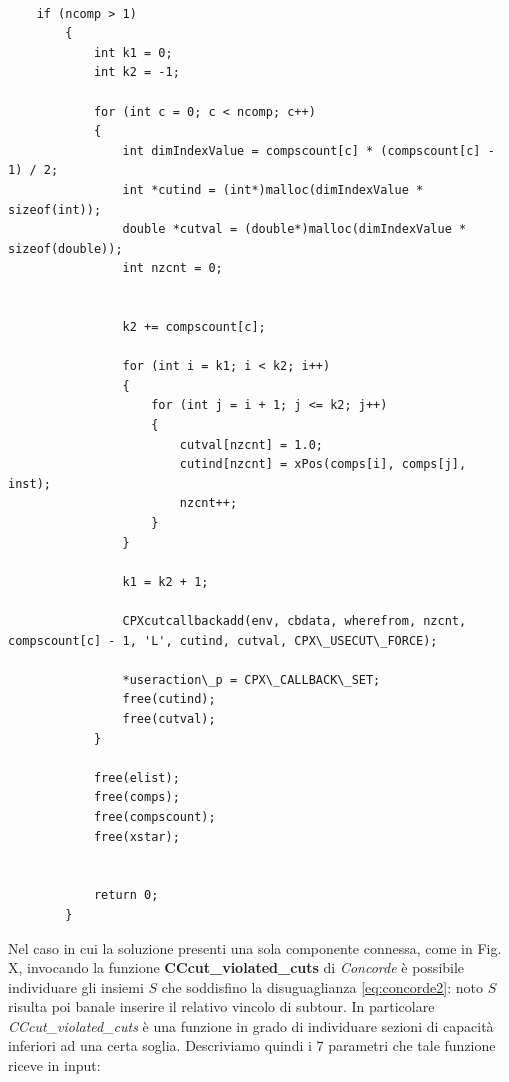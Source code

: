 \documentclass[11pt]{article}
\begin{document}
\begin{lstlisting}

    if (ncomp > 1)
        {
            int k1 = 0;
            int k2 = -1;

            for (int c = 0; c < ncomp; c++)
            {
                int dimIndexValue = compscount[c] * (compscount[c] - 1) / 2; 
                int *cutind = (int*)malloc(dimIndexValue * sizeof(int));
                double *cutval = (double*)malloc(dimIndexValue * sizeof(double));
                int nzcnt = 0;

                
                k2 += compscount[c];

                for (int i = k1; i < k2; i++)
                {
                    for (int j = i + 1; j <= k2; j++)
                    {
                        cutval[nzcnt] = 1.0;
                        cutind[nzcnt] = xPos(comps[i], comps[j], inst);
                        nzcnt++;
                    }
                }

                k1 = k2 + 1;
                
                CPXcutcallbackadd(env, cbdata, wherefrom, nzcnt, compscount[c] - 1, 'L', cutind, cutval, CPX\_USECUT\_FORCE);

                *useraction\_p = CPX\_CALLBACK\_SET; 
                free(cutind);
                free(cutval);
            }

            free(elist);
            free(comps);
            free(compscount);
            free(xstar);


            return 0;
        }

\end{lstlisting}

Nel caso in cui la soluzione presenti una sola componente connessa, come in Fig. X, invocando la funzione \textbf{CCcut\_violated\_cuts} di \textit{Concorde} è possibile individuare gli insiemi $S$ che soddisfino la disuguaglianza \eqref{eq:concorde2}: noto $S$ risulta poi banale inserire il relativo vincolo di subtour. In particolare \textit{CCcut\_violated\_cuts} è una funzione in grado di individuare sezioni di capacità inferiori ad una certa soglia. Descriviamo quindi i 7 parametri che tale funzione riceve in input:
\end{document}
